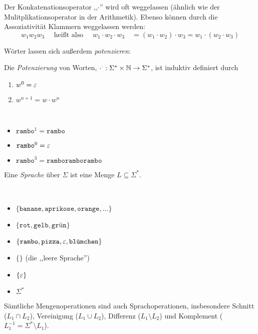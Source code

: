 Der Konkatenationsoperator ,,$\cdot$'' wird oft weggelassen (ähnlich wie der Mulitplikationsoperator in der Arithmetik).
Ebenso können durch die Assoziativität Klammern weggelassen werden:
\begin{displaymath}
  w_1w_2w_3 \quad \text{ heißt also } \quad w_1\cdot w_2\cdot w_3 \quad = (w_1 \cdot w_2) \cdot w_3 = w_1 \cdot (w_2 \cdot w_3)
\end{displaymath}

Wörter lassen sich außerdem \emph{potenzieren}:
\begin{Def}
  Die \emph{Potenzierung} von Worten, $\cdot ^ \cdot: \Sigma^*\times \mathbb{N} \to \Sigma^*$, ist induktiv definiert durch
  \begin{enumerate}
  \item $w^0 = \varepsilon$ 
  \item $w^{n+1} = w \cdot w^n$
  \end{enumerate}
\end{Def}
\begin{Bsp*} ~
  \begin{itemize}
  \item $\mathtt{rambo}^1 = \mathtt{rambo}$
  \item $\mathtt{rambo}^0 = \varepsilon$
  \item $\mathtt{rambo}^3 = \mathtt{ramboramborambo}$
  \end{itemize}
\end{Bsp*}

\begin{Def}[name={[Sprache über $\Sigma$]}]
	Eine \emph{Sprache} über $\Sigma$ ist eine Menge $L\subseteq\Sigma^*$.
\end{Def}
\begin{Bsp*}~ 
  \begin{itemize}
  \item 
	$\{\mathtt{banane}, \mathtt{aprikose},\mathtt{orange},\dots\}$
  \item
    $\{\mathtt{rot},\mathtt{gelb},\texttt{grün}\}$
  \item
    $\{\mathtt{rambo}, \mathtt{pizza}, \varepsilon, \texttt{blümchen}\}$
  \item $\{\}$ (die ,,leere Sprache'')
  \item $\{ \varepsilon \}$
  \item $\Sigma^*$
  \end{itemize}
\end{Bsp*}
Sämtliche Mengenoperationen sind auch Sprachoperationen, insbesondere Schnitt ($L_1 \cap L_2$), Vereinigung ($L_1 \cup L_2$), Differenz ($L_1 \setminus L_2$) und Komplement ($L_1^{-1} = \Sigma^* \setminus L_1$).

